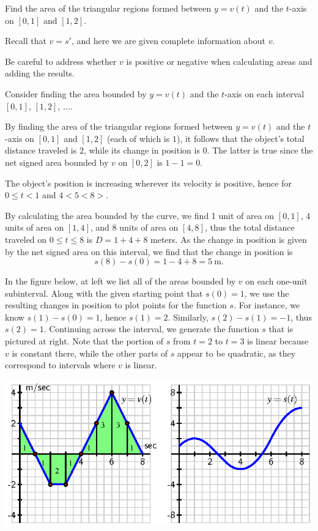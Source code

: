 \begin{bighint}
\ba
	\item Find the area of the triangular regions formed between $y = v(t)$ and the $t$-axis on $[0,1]$ and $[1,2]$.
	\item Recall that $v = s'$, and here we are given complete information about $v$.
	\item Be careful to address whether $v$ is positive or negative when calculating areas and adding the results.
	\item Consider finding the area bounded by $y = v(t)$ and the $t$-axis on each interval $[0,1]$, $[1,2]$, $\ldots$.
\ea
\end{bighint}
\begin{activitySolution}
\ba
	\item By finding the area of the triangular regions formed between $y = v(t)$ and the $t$-axis on $[0,1]$ and $[1,2]$ (each of which is $1$), it follows that the object's total distance traveled is $2$, while its change in position is $0$.  The latter is true since the net signed area bounded by $v$ on $[0,2]$ is $1 - 1 = 0$.
	\item The object's position is increasing wherever its velocity is positive, hence for $0 \le t < 1$ and $4 < 5 < 8>$.
	\item By calculating the area bounded by the curve, we find 1 unit of area on $[0,1]$, 4 units of area on $[1,4]$, and 8 units of area on $[4,8]$, thus the total distance traveled on $0 \le t \le 8$ is $D = 1 + 4 + 8$ meters.  As the change in position is given by the net signed area on this interval, we find that the change in position is
	$$s(8) - s(0) = 1 - 4 + 8 = 5 \ \mbox{m}.$$
	\item In the figure below, at left we list all of the areas bounded by $v$ on each one-unit subinterval.  Along with the given starting point that $s(0) = 1$, we use the resulting changes in position to plot points for the function $s$.  For instance, we know $s(1) - s(0) = 1$, hence $s(1) = 2$.  Similarly, $s(2) - s(1) = -1$, thus $s(2) = 1$.  Continuing across the interval, we generate the function $s$ that is pictured at right.  Note that the portion of $s$ from $t = 2$ to $t = 3$ is linear because $v$ is constant there, while the other parts of $s$ appear to be quadratic, as they correspond to intervals where $v$ is linear.
\ea
\begin{center}
\includegraphics{figures/4_1_Act3Soln.eps}
\end{center}
\end{activitySolution}
\aftera





